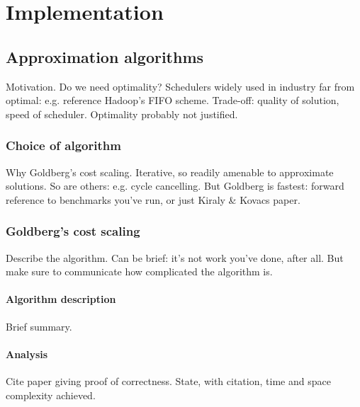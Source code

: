 \chapter{Implementation} \label{chap:impl}

\section{Approximation algorithms} \label{sec:impl-approx}

Motivation. Do we need optimality? Schedulers widely used in industry far from optimal: e.g. reference Hadoop's FIFO scheme. Trade-off: quality of solution, speed of scheduler. Optimality probably not justified.

\subsection{Choice of algorithm} \label{sec:impl-approx-choice}

Why Goldberg's cost scaling. Iterative, so readily amenable to approximate solutions. So are others: e.g. cycle cancelling. But Goldberg is fastest: forward reference to benchmarks you've run, or just Kiraly \& Kovacs paper.

\subsection{Goldberg's cost scaling} \label{sec:impl-approx-cs}

Describe the algorithm. Can be brief: it's not work you've done, after all. But make sure to communicate how complicated the algorithm is.

\subsubsection{Algorithm description}

Brief summary.





\subsubsection{Analysis}

Cite paper giving proof of correctness. State, with citation, time and space complexity achieved.

